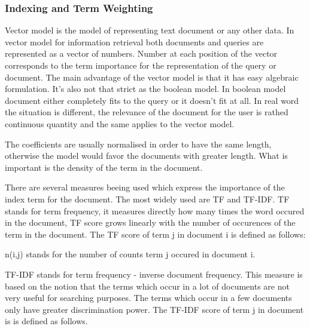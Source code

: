 \subsubsection{Indexing and Term Weighting}
\label{sec:indexing_term_weighting}

Vector model is the model of representing text document or any other data. In vector model for information retrieval both documents and queries are represented as a vector of numbers. Number at each position of the vector corresponds to the term importance for the representation of the query or document. The main advantage of the vector model is that it has easy algebraic formulation. It's also not that strict as the boolean model. In boolean model document either completely fits to the query or it doesn't fit at all. In real word the situation is different, the relevance of the document for the user is rathed continuous quantity and the same applies to the vector model.

The coefficients are usually normalised in order to have the same length, otherwise the model would favor the documents with greater length. What is important is the density of the term in the document.

There are several measures beeing used which express the importance of the index term for the document. The most widely used are TF and TF-IDF. 
TF stands for term frequency, it measures directly how many times the word occured in the document, TF score grows linearly with the number of occurences of the term in the document. The TF score of term j in document i is defined as follows:


n(i,j) stands for the number of counts term j occured in document i.

TF-IDF stands for term frequency - inverse document frequency. This measure is based on the notion that the terms which occur in a lot of documents are not very useful for searching purposes. The terms which occur in a few documents only have greater discrimination power. The TF-IDF score of term j in document is is defined as follows.


